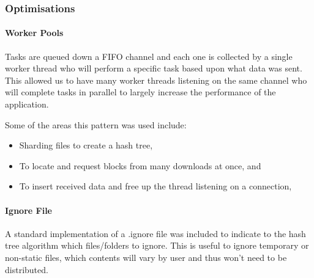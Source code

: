
\subsubsection*{Optimisations}

\paragraph*{Worker Pools}
Tasks are queued down a FIFO channel and each one is collected by a single worker thread who will perform a specific task based upon what data was sent. This allowed us to have many worker threads listening on the same channel who will complete tasks in parallel to largely increase the performance of the application.

\vspace{2mm}\noindent
Some of the areas this pattern was used include:

\begin{itemize}
  \item Sharding files to create a hash tree,
  \item To locate and request blocks from many downloads at once, and
  \item To insert received data and free up the thread listening on a connection,
\end{itemize}

\paragraph*{Ignore File} A standard implementation of a .ignore file was included to indicate to the hash tree algorithm which files/folders to ignore. This is useful to ignore temporary or non-static files, which contents will vary by user and thus won't need to be distributed.